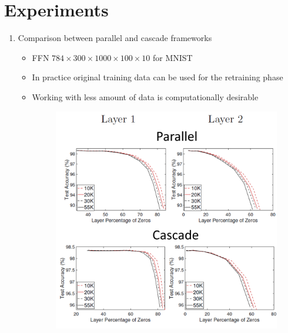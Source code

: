 \section{Experiments}
\begin{enumerate}
	\item Comparison between parallel and cascade frameworks
		\begin{itemize}
	\item FFN $784 \times 300 \times 1000 \times 100 \times 10$ for MNIST
	\item In practice original training data can be used for the retraining phase
	\item Working with less amount of data is computationally desirable
		\begin{figure}[H]
		\centering
		\includegraphics[width=.9\linewidth]{./figs/parallel_vs_cascade.png}  
		\caption*{}
	\end{figure}


\end{itemize}
\end{enumerate}
